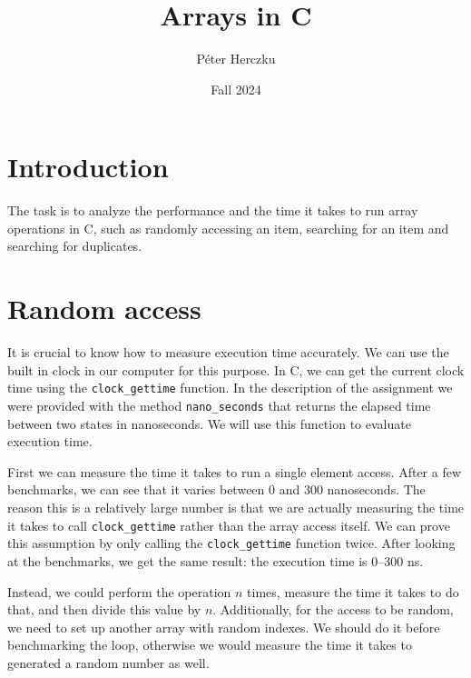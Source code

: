 \documentclass[a4paper,11pt]{article}
\begin{document}
\title{
    \textbf{Arrays in C}
}
\author{Péter Herczku}
\date{Fall 2024}

\maketitle

\section*{Introduction}

The task is to analyze the performance and the time it takes to run array operations in C, such as randomly accessing an item, searching for an item and searching for duplicates.

\section*{Random access}

It is crucial to know how to measure execution time accurately.
We can use the built in clock in our computer for this purpose.
In C, we can get the current clock time using the {\tt clock\_gettime} function.
In the description of the assignment we were provided with the method {\tt nano\_seconds} that returns the elapsed time between two states in nanoseconds.
We will use this function to evaluate execution time.

First we can measure the time it takes to run a single element access.
After a few benchmarks, we can see that it varies between 0 and 300 nanoseconds.
The reason this is a relatively large number is that we are actually measuring the time it takes to call {\tt clock\_gettime} rather than the array access itself.
We can prove this assumption by only calling the {\tt clock\_gettime} function twice.
After looking at the benchmarks, we get the same result: the execution time is 0--300 ns.

Instead, we could perform the operation $n$ times, measure the time it takes to do that, and then divide this value by $n$.
Additionally, for the access to be random, we need to set up another array with random indexes.
We should do it before benchmarking the loop, otherwise we would measure the time it takes to generated a random number as well.
\end{document}
